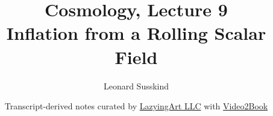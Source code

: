 \documentclass[11pt,oneside]{book}
\begin{document}
\hypersetup{pageanchor=false}
\frontmatter
\title{Cosmology, Lecture 9\\Inflation from a Rolling Scalar Field}
\author{Leonard Susskind}
\date{Transcript-derived notes curated by \href{https://lazying.art}{LazyingArt LLC} with \href{https://github.com/lachlanchen/Video2Book}{Video2Book}}
\maketitle
\clearpage
\hypersetup{pageanchor=true}
\mainmatter

\end{document}
